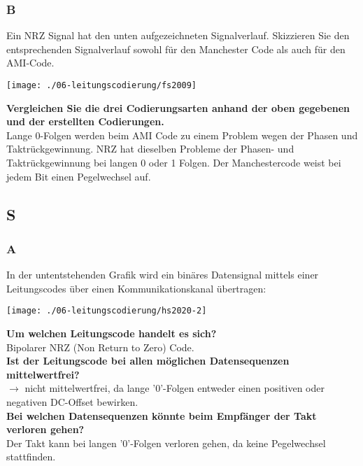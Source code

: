 \subsubsection{B}
Ein NRZ Signal hat den unten aufgezeichneten Signalverlauf. Skizzieren Sie den entsprechenden Signalverlauf sowohl für den Manchester Code als auch für den AMI-Code.
\begin{center}
    \vspace{-8pt}
    \texttt{[image: ./06-leitungscodierung/fs2009]}
    \vspace{-8pt}
\end{center}

\textbf{Vergleichen Sie die drei Codierungsarten anhand der oben gegebenen und der erstellten Codierungen.}\\
Lange 0-Folgen werden beim AMI Code zu einem Problem wegen der Phasen und Taktrückgewinnung. NRZ hat dieselben Probleme der Phasen- und Taktrückgewinnung bei
langen 0 oder 1 Folgen. Der Manchestercode weist bei jedem Bit einen Pegelwechsel auf.

\subsection{S}

\subsubsection{A}
In der untentstehenden Grafik wird ein binäres Datensignal mittels einer Leitungscodes über einen Kommunikationskanal übertragen:
\begin{center}
    \vspace{-8pt}
    \texttt{[image: ./06-leitungscodierung/hs2020-2]}
    \vspace{-8pt}
\end{center}

\textbf{Um welchen Leitungscode handelt es sich?}\\
Bipolarer NRZ (Non Return to Zero) Code.\\

\textbf{Ist der Leitungscode bei allen möglichen Datensequenzen mittelwertfrei?}\\
$\rightarrow$ nicht mittelwertfrei, da lange '0'-Folgen entweder einen positiven oder negativen DC-Offset bewirken.\\

\textbf{Bei welchen Datensequenzen könnte beim Empfänger der Takt verloren gehen?}\\
Der Takt kann bei langen '0'-Folgen verloren gehen, da keine Pegelwechsel stattfinden.\\

